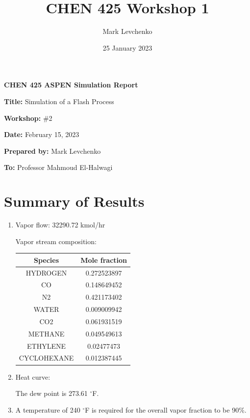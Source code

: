 \documentclass[12pt]{article}
\title{CHEN 425 Workshop 1}
\author{Mark Levchenko}
\date{25 January 2023}
\begin{document}


\textbf{CHEN 425 ASPEN Simulation Report}

\textbf{Title:} Simulation of a Flash Process

\textbf{Workshop:} \#2

\textbf{Date:} February 15, 2023

\textbf{Prepared by:} Mark Levchenko

\textbf{To:} Professor Mahmoud El-Halwagi

\section{Summary of Results}

\begin{enumerate}
    \item Vapor flow: 32290.72 kmol/hr

    Vapor stream composition:

    \begin{tabular}{|c c|}
         \hline
         Species & Mole fraction \\
         \hline
            HYDROGEN & 0.272523897 \\
            CO & 0.148649452 \\
            N2 & 0.421173402 \\
            WATER & 0.009009942 \\
            CO2 & 0.061931519 \\ 
            METHANE & 0.049549613 \\
            ETHYLENE & 0.02477473 \\
            CYCLOHEXANE & 0.012387445 \\
         \hline
    \end{tabular}

    \item Heat curve:

    

    The dew point is 273.61 $^\circ$F.

    \item A temperature of 240 $^\circ$F is required for the overall vapor fraction to be 90\%.
\end{enumerate}
\end{document}
